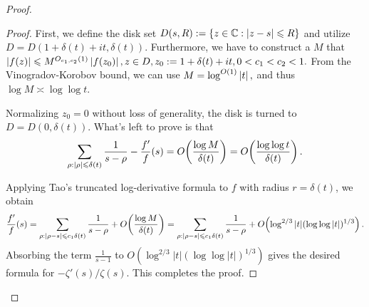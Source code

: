 \begin{proof}
\begin{proof}
First, we define the disk set $D(s, R) := \left\{ z \in \mathbb{C}: \left\lvert z - s \right\rvert \leqslant R \right\}$ and utilize $D = D(1+\delta(t)+it, \delta(t)).$ Furthermore, we have to construct a $M$ that $\left\lvert f(z) \right\rvert \leqslant M^{O_{c_1, c_2}(1)} \left\lvert f(z_0) \right\rvert, z \in D, z_0 := 1+\delta(t)+it, 0 < c_1 < c_2 < 1.$ From the Vinogradov-Korobov bound, we can use $M = \log^{O(1)} \left\lvert t \right\rvert,$ and thus $\log M \asymp \log \log t.$ 

Normalizing $z_0 = 0$ without loss of generality, the disk is turned to $D = D(0, \delta(t))$. What's left to prove is that $$\sum_{\rho: \left\lvert \rho \right\rvert \leqslant \delta(t)} \frac{1}{s - \rho} - \frac{f'}{f}(s) = O\!\left(\frac{\log M}{\delta(t)}\right) = O\!\left(\frac{\log \log t}{\delta(t)}\right).$$ 

Applying Tao’s truncated log-derivative formula to $f$ with radius
$r = \delta(t)$, we obtain $$\frac{f'}{f}(s) = \sum_{\rho: |\rho - s| \leqslant c_1 \delta(t)} \frac{1}{s-\rho} + O\!\left(\frac{\log M}{\delta(t)}\right) = \sum_{\rho: |\rho - s| \leqslant c_1 \delta(t)} \frac{1}{s-\rho} + O\! \left( \log^{2/3}|t|(\log\log|t|)^{1/3} \right).$$ Absorbing the term $\frac{1}{s-1}$ to $O(\log^{2/3}|t|(\log\log|t|)^{1/3})$ gives the desired formula for $-\zeta'(s)/\zeta(s)$. This completes the proof.
\end{proof}


\end{proof}
